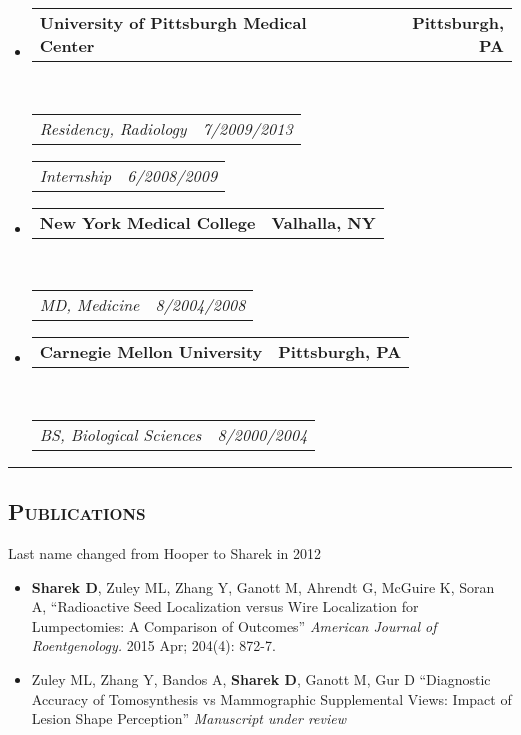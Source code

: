 \documentclass[12pt,letterpaper,oneside]{article}
\makeatletter
\newcommand{\headerrow}[2]
{\begin{tabular*}{\linewidth}{l@{\extracolsep{\fill}}r}
	#1 &
	#2 \\
\end{tabular*}}
\makeatother
\begin{document}
\begin{itemize}
	\parskip=0.1em

	\item 
	\headerrow
		{\textbf{University of Pittsburgh Medical Center}}
		{\textbf{Pittsburgh, PA}}
	\\
	\headerrow
		{\emph{Residency, Radiology}}
		{\emph{7/2009\textendash 6/2013}}
	\headerrow
		{\emph{Internship}}
		{\emph{6/2008\textendash 6/2009}}
	\vspace{-6mm}
\end{itemize}

\begin{itemize}
	\parskip=0.1em

	\item 
	\headerrow
		{\textbf{New York Medical College}}
		{\textbf{Valhalla, NY}}
	\\
	\headerrow
		{\emph{MD, Medicine}}
		{\emph{8/2004\textendash 5/2008}}
	\vspace{-6mm}
\end{itemize}

\begin{itemize}
	\parskip=0.1em

	\item 
	\headerrow
		{\textbf{Carnegie Mellon University}}
		{\textbf{Pittsburgh, PA}}
	\\
	\headerrow
		{\emph{BS, Biological Sciences}}
		{\emph{8/2000\textendash 5/2004}}
	\vspace{-6mm}
\end{itemize}
	\vspace{3mm}

\hrule
\vspace{-0.4em}
\subsection*{\centering\textsc{Publications}}
\vspace{-0.4em}
{\hfill \scriptsize * Last name changed from Hooper to Sharek in 2012}
\vspace{-0.4em}
\begin{itemize}
	\parskip=0.1em
	\item \textbf{Sharek D}, Zuley ML, Zhang Y, Ganott M, Ahrendt G, McGuire K, Soran A, ``Radioactive Seed Localization versus Wire Localization for Lumpectomies: A Comparison of Outcomes''  \emph{American Journal of Roentgenology.} 2015 Apr; 204(4): 872-7.
\end{itemize}

\begin{itemize}
	\parskip=0.1em
	\item Zuley ML, Zhang Y, Bandos A, \textbf{Sharek D}, Ganott M, Gur D ``Diagnostic Accuracy of Tomosynthesis vs Mammographic Supplemental Views: Impact of Lesion Shape Perception'' \emph{Manuscript under review}
\end{itemize}
\end{document}
